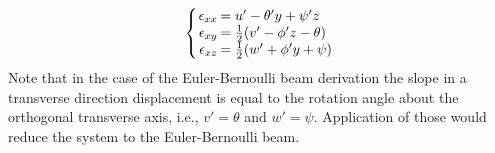 %
\begin{equation}\label{eq:StrainEvaluatedSimple}
\left\{\arraycolsep=1pt\begin{array}{rl}
\epsilon_{xx}&=u'-\theta'y+\psi'z\\
\epsilon_{xy}&=\frac{1}{2}(v'-\phi'z-\theta)\\
\epsilon_{xz}&=\frac{1}{2}(w'+\phi'y+\psi)
\end{array}\right.
\end{equation}
Note that in the case of the Euler-Bernoulli beam derivation the slope in a transverse direction displacement is equal to the rotation angle about the orthogonal transverse axis, i.e., $v'=\theta$ and $w'=\psi$. Application of those would reduce the system to the Euler-Bernoulli beam.\par

